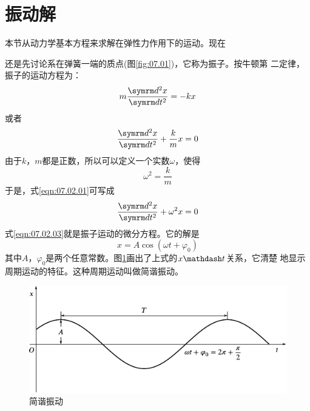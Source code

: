\section[振动解]{振\hspace{1em}动\hspace{1em}解}\label{sec:07.02}

本节从动力学基本方程来求解在弹性力作用下的运动。现在

\noindent
还是先讨论系在弹簧一端的质点(图\ref{fig:07.01})，它称为振子。按牛顿第
二定律，振子的运动方程为：
\begin{equation*}
  m \frac { \dif ^ { 2 } x } { \dif t ^ { 2 } } = - k x
\end{equation*}
或者
\begin{equation}\label{eqn:07.02.01}
  \frac { \dif ^ { 2 } x } { \dif t ^ { 2 } } + \frac { k } { m } x = 0
\end{equation}
由于$ k $，$ m $都是正数，所以可以定义一个实数$ \omega $，使得
\begin{equation}\label{eqn:07.02.02}
  \omega ^ { 2 } = \frac { k } { m }
\end{equation}
于是，式\eqref{eqn:07.02.01}可写成
\begin{equation}\label{eqn:07.02.03}
  \frac { \dif ^ { 2 } x } { \dif t ^ { 2 } } + \omega ^ { 2 } x = 0
\end{equation}
式\eqref{eqn:07.02.03}就是振子运动的微分方程。它的解是
\begin{equation}\label{eqn:07.02.04}
  x = A \cos \left( \omega t + \varphi _ { 0 } \right)
\end{equation}
其中$ A $，$ \varphi _ { 0 } $是两个任意常数。图\ref{fig:07.05}\;画出了上式的$ x \mathdash t $关系，它清楚
地显示周期运动的特征。这种周期运动叫做简谐振动。
\begin{figure}[h]
  \vspace{1em}
  \centering
  \includegraphics{figure/fig07.05}
  \caption{简谐振动}
  \label{fig:07.05}
\end{figure}

